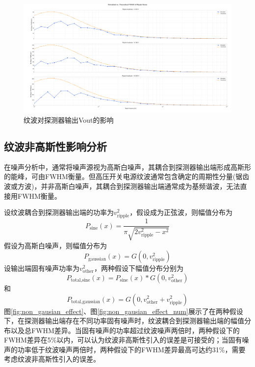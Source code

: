 \documentclass[twocolumn]{ctexart}
\begin{document}
\begin{figure}[htbp]
    \centering
    \includegraphics[width=\linewidth]{./circ_sim_result.png}
    \caption{纹波对探测器输出Vout的影响}
    \label{fig:circ_sim_result}
\end{figure}

\subsection{纹波非高斯性影响分析}

在噪声分析中，通常将噪声源视为高斯白噪声\cite{13}，其耦合到探测器输出端形成高斯形的能峰，可由FWHM衡量。但高压开关电源纹波通常包含确定的周期性分量(锯齿波或方波)，并非高斯白噪声，其耦合到探测器输出端通常成为基频谐波，无法直接用FWHM衡量。

设纹波耦合到探测器输出端的功率为$v_\text{ripple}^2$，假设成为正弦波，则幅值分布为
\begin{equation*}
P_\text{sine}(x)=\frac{1}{\pi\sqrt{2v_\text{ripple}^2-x^2}}
\end{equation*}
假设为高斯白噪声，则幅值分布为
\begin{equation*}
P_\text{gaussian}(x)=G(0, v_\text{ripple}^2)
\end{equation*}
设输出端固有噪声功率为$v_\text{other}^2$，两种假设下幅值分布分别为
\begin{equation*}
P_\text{total,sine}(x)=P_\text{sine}(x)*G(0, v_\text{other}^2)
\end{equation*}
和
\begin{equation*}
P_\text{total,gaussian}(x)=G(0, v_\text{other}^2+v_\text{ripple}^2)
\end{equation*}
图\ref{fig:non_gausian_effect}、图\ref{fig:non_gausian_effect_num}展示了在两种假设下，在探测器输出端存在不同功率固有噪声时，纹波耦合到探测器输出端的幅值分布以及总FWHM差异。当固有噪声的功率超过纹波噪声两倍时，两种假设下的FWHM差异在5\%以内，可以认为纹波非高斯性引入的误差是可接受的；当固有噪声的功率低于纹波噪声两倍时，两种假设下的FWHM差异最高可达约31\%，需要考虑纹波非高斯性引入的误差。
\end{document}
